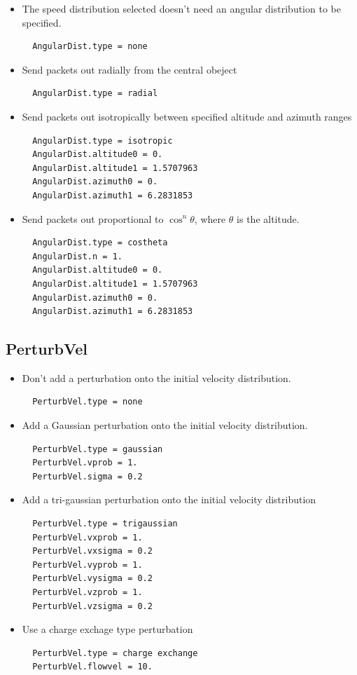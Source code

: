 \documentclass[11pt]{article}
\begin{document}
\begin{itemize}
\item The speed distribution selected doesn't need an angular distribution to
be specified.
  \begin{verbatim}
  AngularDist.type = none
  \end{verbatim}
\item Send packets out radially from the central obeject
  \begin{verbatim}
  AngularDist.type = radial
  \end{verbatim}
\item Send packets out isotropically between specified altitude and azimuth
ranges
  \begin{verbatim}
  AngularDist.type = isotropic
  AngularDist.altitude0 = 0.
  AngularDist.altitude1 = 1.5707963
  AngularDist.azimuth0 = 0.
  AngularDist.azimuth1 = 6.2831853
  \end{verbatim}
\item Send packets out proportional to $\cos^n \theta$, where $\theta$ is the
altitude.
  \begin{verbatim}
  AngularDist.type = costheta
  AngularDist.n = 1.
  AngularDist.altitude0 = 0.
  AngularDist.altitude1 = 1.5707963
  AngularDist.azimuth0 = 0.
  AngularDist.azimuth1 = 6.2831853
  \end{verbatim}
\end{itemize}

\subsection{PerturbVel}

\begin{itemize}
\item Don't add a perturbation onto the initial velocity distribution.
  \begin{verbatim}
  PerturbVel.type = none
  \end{verbatim}
\item Add a Gaussian perturbation onto the initial velocity distribution.
  \begin{verbatim}
  PerturbVel.type = gaussian
  PerturbVel.vprob = 1.
  PerturbVel.sigma = 0.2
  \end{verbatim}
\item Add a tri-gaussian perturbation onto the initial velocity distribution
  \begin{verbatim}
  PerturbVel.type = trigaussian
  PerturbVel.vxprob = 1.
  PerturbVel.vxsigma = 0.2
  PerturbVel.vyprob = 1.
  PerturbVel.vysigma = 0.2
  PerturbVel.vzprob = 1.
  PerturbVel.vzsigma = 0.2
  \end{verbatim}
\item Use a charge exchage type perturbation
  \begin{verbatim}
  PerturbVel.type = charge exchange
  PerturbVel.flowvel = 10.
  \end{verbatim}
\end{itemize}
\end{document}

